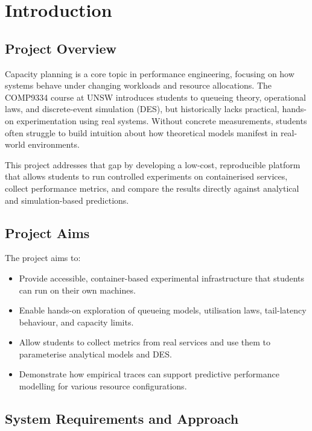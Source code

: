 \chapter{Introduction}\label{ch:intro}

\section*{Project Overview}

Capacity planning is a core topic in performance engineering, focusing on
how systems behave under changing workloads and resource allocations.
The COMP9334 course at UNSW introduces students to queueing theory,
operational laws, and discrete-event simulation (DES), but historically
lacks practical, hands-on experimentation using real systems. Without
concrete measurements, students often struggle to build intuition about
how theoretical models manifest in real-world environments.

This project addresses that gap by developing a low-cost, reproducible
platform that allows students to run controlled experiments on
containerised services, collect performance metrics, and compare the
results directly against analytical and simulation-based predictions.

\section*{Project Aims}

The project aims to:

\begin{itemize}
    \item Provide accessible, container-based experimental infrastructure
          that students can run on their own machines.
    \item Enable hands-on exploration of queueing models, utilisation
          laws, tail-latency behaviour, and capacity limits.
    \item Allow students to collect metrics from real services and use
          them to parameterise analytical models and DES.
    \item Demonstrate how empirical traces can support predictive
          performance modelling for various resource configurations.
\end{itemize}

\section*{System Requirements and Approach}

